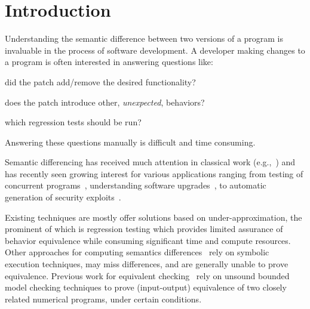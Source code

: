 \section{Introduction} 



Understanding the semantic difference between two versions of a program is invaluable in the process of software development. A developer making changes to a program is often interested in answering questions like:
\begin{inparaenum}[(i)]
\item did the patch add/remove the desired functionality?
\item does the patch introduce other, \emph{unexpected}, behaviors?
\item which regression tests should be run?
\end{inparaenum}
Answering these questions manually is difficult and time consuming.

Semantic differencing has received much attention in classical work (e.g.,~\cite{Horwitz90,Horwitz89,Hoare69}) and has recently seen growing interest for various applications ranging from testing of concurrent programs~\cite{ChakiGurfinkelStrichman12}, understanding software upgrades~\cite{JinOrsoXie10}, to automatic generation of security exploits~\cite{BrumleyPoosankamSongZheng08}.

Existing techniques are mostly offer solutions based on  under-approximation, the prominent of which is regression testing which provides limited assurance of behavior equivalence while consuming significant time and compute resources. 
Other approaches for computing semantics differences~\cite{DwyerElbaumPerson08,EnglerRamos11} rely on symbolic execution techniques, may miss differences, and are generally unable to prove equivalence. Previous work for equivalent checking~\cite{GodlinStrichman09} rely on unsound bounded model checking techniques to prove (input-output) equivalence of two closely related numerical programs, under certain conditions.

